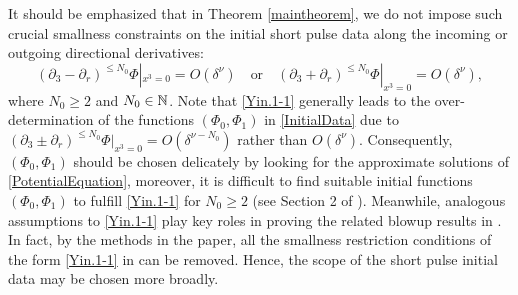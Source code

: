 \documentclass[11pt,twoside]{article}
\begin{document}
\begin{remark}\label{Yin.1}
It should be emphasized that in Theorem \ref{maintheorem}, we do not impose such crucial smallness constraints on the initial short pulse data
along the incoming  or outgoing directional derivatives:
\begin{equation}\label{Yin.1-1}
(\partial_3-\partial_r)^{\leq N_0}\Phi|_{x^3=0}=O(\delta^{\nu}) \quad \text{or} 
\quad (\partial_3+\partial_r)^{\leq N_0} \Phi|_{x^3=0}=O(\delta^{\nu}),
\end{equation}
where $N_0\ge 2$ and $N_0\in\Bbb N$. Note that \eqref{Yin.1-1} generally leads to the over-determination of
the functions $(\Phi_0, \Phi_1)$ in \eqref{InitialData} due to $(\partial_3\pm\partial_r)^{\leq N_0}\Phi|_{x^3=0}=O(\delta^{\nu-N_0})$
rather than $O(\delta^{\nu})$. Consequently, $(\Phi_0, \Phi_1)$ should be chosen delicately by looking for the
approximate solutions of \eqref{PotentialEquation}, moreover, it is difficult to find suitable initial functions $(\Phi_0, \Phi_1)$
to fulfill \eqref{Yin.1-1} for $N_0\ge 2$ (see Section 2 of \cite{Ding3}).
Meanwhile, analogous assumptions to \eqref{Yin.1-1} play key roles in proving  the related blowup results in
\cite{Ch2, K-R, M-Y, L-Y}. In fact, by the methods in the paper, all the smallness
restriction conditions of the form \eqref{Yin.1-1}  in \cite{M-Y, L-Y} can be removed. Hence, the scope of the short pulse initial data may
be chosen more broadly.
\end{remark}
\end{document}
